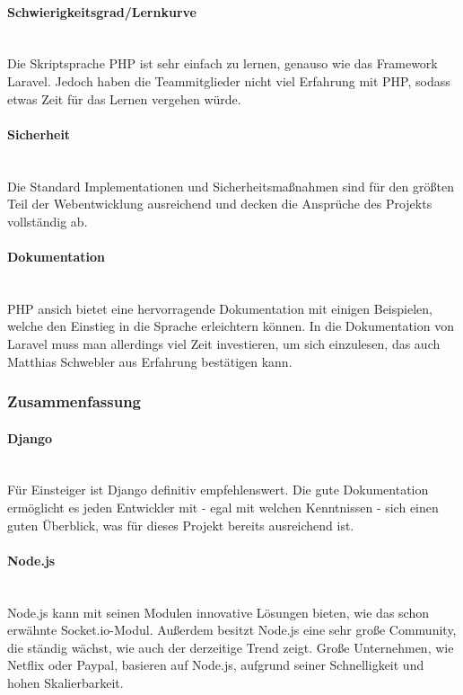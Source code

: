 \paragraph{Schwierigkeitsgrad/Lernkurve} \mbox{}\\
Die Skriptsprache \gls{PHP} ist sehr einfach zu lernen, genauso wie das Framework Laravel. Jedoch haben die Teammitglieder nicht viel Erfahrung mit \gls{PHP}, sodass etwas Zeit f\"ur das Lernen vergehen w\"urde.

\paragraph{Sicherheit} \mbox{}\\
Die Standard Implementationen und Sicherheitsmaßnahmen sind für den größten Teil der Webentwicklung ausreichend und decken die Ansprüche des Projekts vollständig ab.

\paragraph{Dokumentation} \mbox{}\\
\gls{PHP} ansich bietet eine hervorragende Dokumentation mit einigen Beispielen, welche den Einstieg in die Sprache erleichtern können. In die Dokumentation von Laravel muss man allerdings viel Zeit investieren, um sich einzulesen, das auch Matthias Schwebler aus Erfahrung bestätigen kann.

\clearpage
\subsubsection{Zusammenfassung}
\paragraph{Django} \mbox{}\\
F\"ur Einsteiger ist Django definitiv empfehlenswert. Die gute Dokumentation erm\"oglicht es jeden Entwickler mit - egal mit welchen Kenntnissen - sich einen guten \"Uberblick, was f\"ur dieses Projekt bereits ausreichend ist.
\paragraph{Node.js} \mbox{}\\
Node.js kann mit seinen Modulen innovative L\"osungen bieten, wie das schon erw\"ahnte Socket.io-Modul. Au{\ss}erdem besitzt Node.js eine sehr gro{\ss}e Community, die st\"andig w\"achst, wie auch der derzeitige Trend zeigt. Gro{\ss}e Unternehmen, wie Netflix oder Paypal, basieren auf Node.js, aufgrund seiner Schnelligkeit und hohen Skalierbarkeit. \cite{paypal} \cite{netflix}
